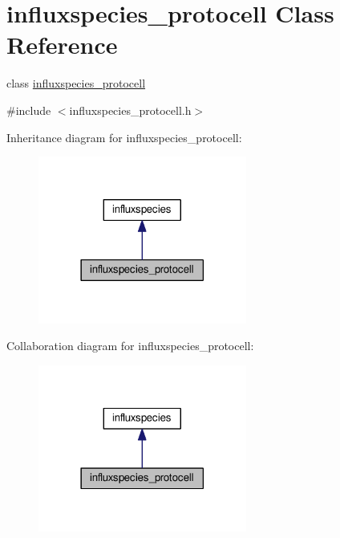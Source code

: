 \hypertarget{a00015}{\section{influxspecies\-\_\-protocell Class Reference}
\label{a00015}
}


class \hyperlink{a00015}{influxspecies\-\_\-protocell}  




{\ttfamily \#include $<$influxspecies\-\_\-protocell.\-h$>$}



Inheritance diagram for influxspecies\-\_\-protocell\-:\nopagebreak
\begin{figure}[H]
\begin{center}
\leavevmode
\includegraphics[width=194pt]{a00094}
\end{center}
\end{figure}


Collaboration diagram for influxspecies\-\_\-protocell\-:\nopagebreak
\begin{figure}[H]
\begin{center}
\leavevmode
\includegraphics[width=194pt]{a00095}
\end{center}
\end{figure}

